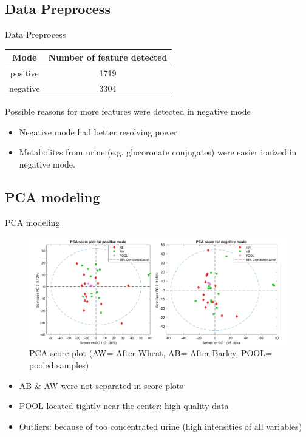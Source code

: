 \documentclass{beamer}
\begin{document}
\subsection{Data Preprocess }
\begin{frame}{Data Preprocess }
\begin{table}
\centering
\begin{tabular}{c|c}
Mode & Number of feature detected \\\hline
positive & 1719 \\
negative & 3304
\end{tabular}
\end{table}
\begin{block}{Possible reasons for more features were detected in negative mode}
\begin{itemize}
\item Negative mode had better resolving power
\item Metabolites from urine (e.g. glucoronate conjugates) were easier ionized in negative mode.
\end{itemize}
\end{block}
\end{frame}

\subsection{PCA modeling}
\begin{frame}{PCA modeling}
\begin{figure}[h]
    \centering
    \includegraphics[scale=0.3]{images/pca_score.png}
    \caption{PCA score plot (AW= After Wheat, AB= After Barley, POOL= pooled samples)}
\end{figure}

\begin{itemize}
\item AB \& AW were not separated in score plots
\item POOL located tightly near the center: high quality data
\item Outliers: because of too concentrated urine (high intensities of all variables)

\end{itemize}
\end{frame}
\end{document}
